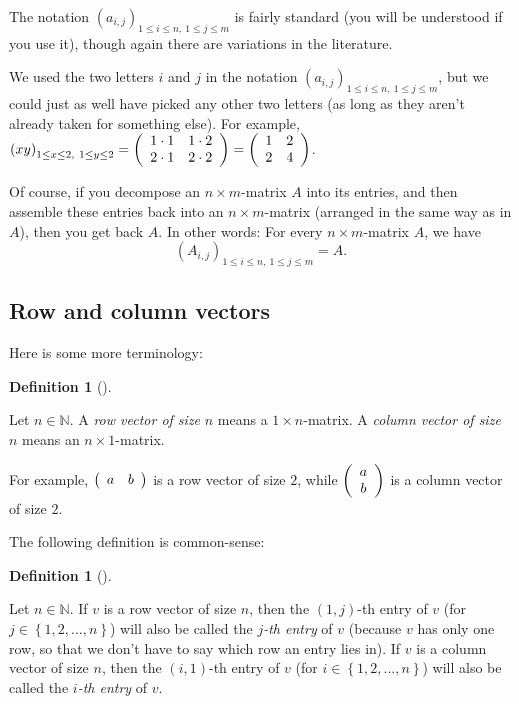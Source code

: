 \documentclass[numbers=enddot,12pt,final,onecolumn,notitlepage]{scrartcl}%
\theoremstyle{definition}
\newtheorem{defi}[theo]{Definition}
\newenvironment{definition}[1][]
{\begin{defi}[#1]\begin{leftbar}}
{\end{leftbar}\end{defi}}
\begin{document}
The notation $\left(  a_{i,j}\right)  _{1\leq i\leq n,\ 1\leq j\leq m}$ is
fairly standard (you will be understood if you use it), though again there are
variations in the literature.

We used the two letters $i$ and $j$ in the notation $\left(  a_{i,j}\right)
_{1\leq i\leq n,\ 1\leq j\leq m}$, but we could just as well have picked any
other two letters (as long as they aren't already taken for something else).
For example, $\left(  xy\right)  _{1\leq x\leq2,\ 1\leq y\leq2}=\left(
\begin{array}
[c]{cc}%
1\cdot1 & 1\cdot2\\
2\cdot1 & 2\cdot2
\end{array}
\right)  =\left(
\begin{array}
[c]{cc}%
1 & 2\\
2 & 4
\end{array}
\right)  $.

Of course, if you decompose an $n\times m$-matrix $A$ into its entries, and
then assemble these entries back into an $n\times m$-matrix (arranged in the
same way as in $A$), then you get back $A$. In other words: For every $n\times
m$-matrix $A$, we have%
\[
\left(  A_{i,j}\right)  _{1\leq i\leq n,\ 1\leq j\leq m}=A.
\]


\subsection{Row and column vectors}

Here is some more terminology:

\begin{definition}
Let $n\in\mathbb{N}$. A \textit{row vector of size }$n$ means a $1\times
n$-matrix. A \textit{column vector of size }$n$ means an $n\times1$-matrix.
\end{definition}

For example, $\left(
\begin{array}
[c]{cc}%
a & b
\end{array}
\right)  $ is a row vector of size $2$, while $\left(
\begin{array}
[c]{c}%
a\\
b
\end{array}
\right)  $ is a column vector of size $2$.

The following definition is common-sense:

\begin{definition}
Let $n\in\mathbb{N}$. If $v$ is a row vector of size $n$, then the $\left(
1,j\right)  $-th entry of $v$ (for $j\in\left\{  1,2,\ldots,n\right\}  $) will
also be called the $j$\textit{-th entry} of $v$ (because $v$ has only one row,
so that we don't have to say which row an entry lies in). If $v$ is a column
vector of size $n$, then the $\left(  i,1\right)  $-th entry of $v$ (for
$i\in\left\{  1,2,\ldots,n\right\}  $) will also be called the $i$\textit{-th
entry} of $v$.
\end{definition}
\end{document}
